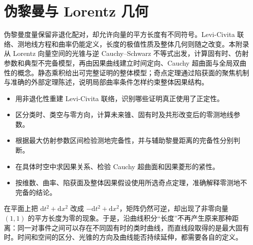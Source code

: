 
% 
% 
% 
% 
% 

\chapter{伪黎曼与 Lorentz 几何}
\label{g3:app:A}

\begin{chapterabstract}
	伪黎曼度量保留非退化配对，却允许向量的平方长度有不同符号。Levi-Civita 联络、测地线方程和曲率仍能定义，长度的极值性质及整体几何则随之改变。本附录从 Lorentz 向量空间的光锥与逆 Cauchy--Schwarz 不等式出发，计算固有时、仿射参数和典型不完备模型，再由因果曲线建立时间定向、Cauchy 超曲面与全局双曲性的概念。静态乘积给出可完整证明的整体模型；奇点定理通过陷获面的聚焦机制与准确的外部定理陈述，说明局部曲率条件怎样约束整体因果结构。
\end{chapterabstract}

\begin{learninggoals}
	\begin{itemize}
		\item 用非退化性重建 Levi-Civita 联络，识别哪些证明真正使用了正定性。
		\item 区分类时、类空与零方向，计算未来锥、固有时及共形改变后的零测地线参数。
		\item 根据最大仿射参数区间检验测地完备性，并与辅助黎曼距离的完备性分别判断。
		\item 在具体时空中求因果关系、检验 Cauchy 超曲面和因果菱形的紧性。
		\item 按维数、曲率、陷获面及整体因果假设使用所选奇点定理，准确解释零测地不完备的结论。
	\end{itemize}
\end{learninggoals}

在平面上把 \(\mathrm dt^2+\mathrm dx^2\) 改成 \(-\mathrm dt^2+\mathrm dx^2\)，矩阵仍然可逆，却出现了非零向量 \((1,1)\) 的平方长度为零的现象。于是，沿曲线积分“长度”不再产生原来那种距离：同一对事件之间可以存在不同固有时的类时曲线，而直线段取得的是最大固有时。时间和空间的区分、光锥的方向及曲线能否持续延伸，都需要各自的定义。

